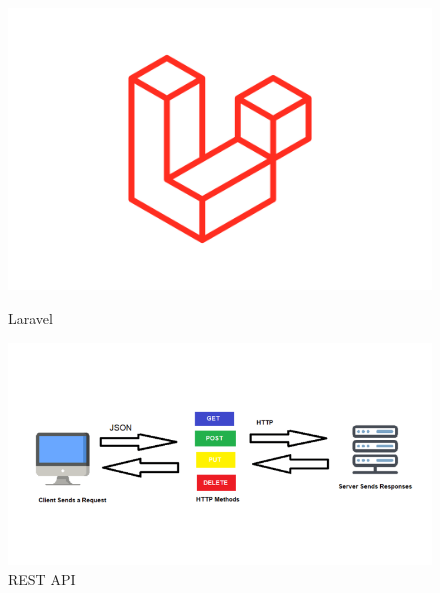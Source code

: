\begin{figure}[H]
    \centering
    \begin{minipage}{0.45\textwidth}
        \centering
        \includegraphics[width=\linewidth]{chapters/chapter 1/figures/laravel.png}
        \caption{Laravel}
        \label{fig:laravel}
    \end{minipage}%
    \hfill
    \begin{minipage}{0.45\textwidth}
        \centering
        \includegraphics[width=\linewidth]{chapters/chapter 1/figures/rest-api.png}
        \caption{REST API}
        \label{fig:restapi}
    \end{minipage}

    \vspace{0.5cm} %


\end{figure}
